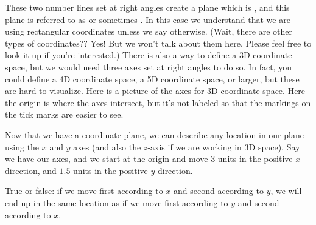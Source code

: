 \documentclass{ximera}
\begin{document}
These two number lines set at right angles create a plane which is , and this plane is referred to as  or sometimes . In this case we understand that we are using rectangular coordinates unless we say otherwise. (Wait, there are other types of coordinates?? Yes! But we won't talk about them here. Please feel free to look it up if you're interested.) There is also a way to define a 3D coordinate space, but we would need three axes set at right angles to do so. In fact, you could define a 4D coordinate space, a 5D coordinate space, or larger, but these are hard to visualize. Here is a picture of the axes for 3D coordinate space. Here the origin is where the axes intersect, but it's not labeled so that the markings on the tick marks are easier to see.
\begin{image}
\end{image}


Now that we have a coordinate plane, we can describe any location in our plane using the $x$ and $y$ axes (and also the $z$-axis if we are working in 3D space). Say we have our axes, and we start at the origin and move $3$ units in the positive $x$-direction, and $1.5$ units in the positive $y$-direction.
\begin{question}
True or false: if we move first according to $x$ and second according to $y$, we will end up in the same location as if we move first according to $y$ and second according to $x$.
\begin{multipleChoice}
\end{multipleChoice}
\end{question}
\end{document}
